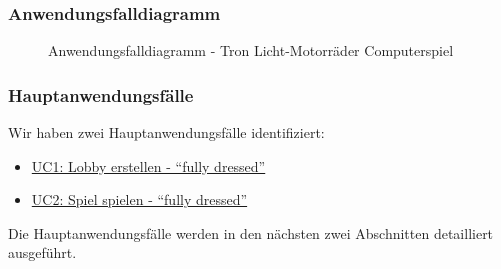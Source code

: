 \documentclass[11pt,ngerman]{article}
\newcommand{\quotes}[1]{``#1''}
\begin{document}
    \subsubsection{Anwendungsfalldiagramm}
    \begin{figure}[H]
    	\centering
    	\caption{Anwendungsfalldiagramm - Tron Licht-Motorräder Computerspiel}
    	\label{fig:UseCaseDiagram}
    \end{figure}

    \subsubsection{Hauptanwendungsfälle}
    Wir haben zwei Hauptanwendungsfälle identifiziert:
    \begin{itemize}
    	\item  \hyperref[ssec:UC1Lobbyerstellen]{UC1: Lobby erstellen - \quotes{fully dressed}}
    	\item\hyperref[ssec:UC2Spielspielen]{UC2: Spiel spielen - \quotes{fully dressed}}
    \end{itemize}
    Die Hauptanwendungsfälle werden in den nächsten zwei Abschnitten detailliert ausgeführt.
\end{document}
